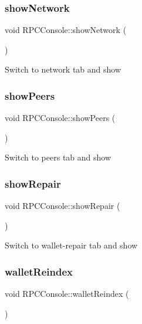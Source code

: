 \subsubsection{\texorpdfstring{show\+Network}{showNetwork}}
{\footnotesize\ttfamily void R\+P\+C\+Console\+::show\+Network (\begin{DoxyParamCaption}{ }\end{DoxyParamCaption})\hspace{0.3cm}{\ttfamily [slot]}}

Switch to network tab and show \mbox{\label{class_r_p_c_console_a95e38366e41ff43dea094b1c5ff4d340}} 
\subsubsection{\texorpdfstring{show\+Peers}{showPeers}}
{\footnotesize\ttfamily void R\+P\+C\+Console\+::show\+Peers (\begin{DoxyParamCaption}{ }\end{DoxyParamCaption})\hspace{0.3cm}{\ttfamily [slot]}}

Switch to peers tab and show \mbox{\label{class_r_p_c_console_a778d71231f31de641e70702b341ded04}} 
\subsubsection{\texorpdfstring{show\+Repair}{showRepair}}
{\footnotesize\ttfamily void R\+P\+C\+Console\+::show\+Repair (\begin{DoxyParamCaption}{ }\end{DoxyParamCaption})\hspace{0.3cm}{\ttfamily [slot]}}

Switch to wallet-\/repair tab and show \mbox{\label{class_r_p_c_console_ac0e0d64fc96a4621dcb8006eafbb3bc5}} 
\subsubsection{\texorpdfstring{wallet\+Reindex}{walletReindex}}
{\footnotesize\ttfamily void R\+P\+C\+Console\+::wallet\+Reindex (\begin{DoxyParamCaption}{ }\end{DoxyParamCaption})\hspace{0.3cm}{\ttfamily [slot]}}

